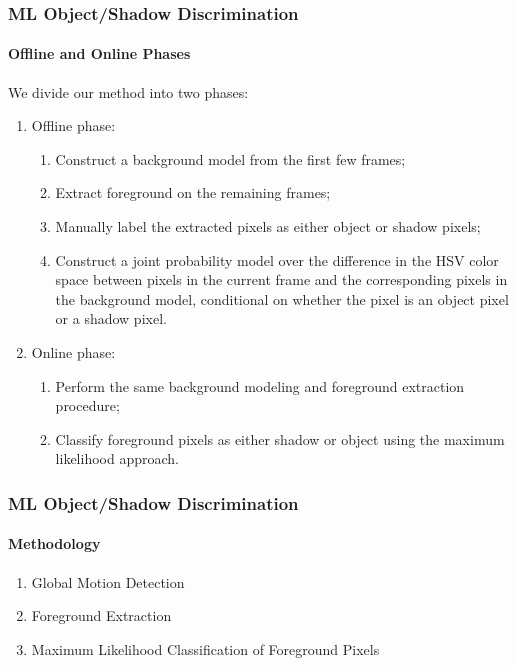\begin{frame}
    \frametitle{ML Object/Shadow Discrimination}
    \framesubtitle{Offline and Online Phases}

    We divide our method into two phases:
    \begin{enumerate}
        \item Offline phase: 
            \begin{enumerate}
                \item Construct a background model from the first few frames;
                \item Extract foreground on the remaining frames;
                \item Manually label the extracted pixels as either object or 
                    shadow pixels;
                \item Construct a joint probability model over the difference in the
                    HSV color space between pixels in the current frame and the
                    corresponding pixels in the background model, conditional on
                    whether the pixel is an object pixel or a shadow pixel.
            \end{enumerate}
        \item Online phase:
            \begin{enumerate}
                \item Perform the same background modeling and foreground extraction 
                    procedure;
                \item Classify foreground pixels as either shadow or object using 
                    the maximum likelihood approach.
        \end{enumerate}
    \end{enumerate}

\end{frame}


\ifnum{}

\begin{frame}
    \frametitle{ML Object/Shadow Discrimination}
    \framesubtitle{Methodology}

    \begin{enumerate}
        \item Global Motion Detection
        \item Foreground Extraction
        \item Maximum Likelihood Classification of Foreground Pixels
    \end{enumerate}

\end{frame}

